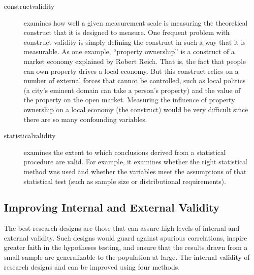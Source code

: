 \begin{description}
	\item[\Gls{constructvalidity}] examines how well a given measurement scale is measuring the theoretical construct that it is designed to measure. One frequent problem with construct validity is simply defining the construct in such a way that it is measurable. As one example, ``property ownership'' is a construct of a market economy explained by Robert Reich\cite{reich2016saving}. That is, the fact that people can own property drives a local economy. But this construct relies on a number of external forces that cannot be controlled, such as local politics (a city's eminent domain can take a person's property) and the value of the property on the open market. Measuring the influence of property ownership on a local economy (the construct) would be very difficult since there are so many confounding variables. 
	
	\item[\Gls{statisticalvalidity}] examines the extent to which conclusions derived from a statistical procedure are valid. For example, it examines whether the right statistical method was used and whether the variables meet the assumptions of that statistical test (such as sample size or distributional requirements). 
	
\end{description}

\subsection{Improving Internal and External Validity}

The best research designs are those that can assure high levels of internal and external validity. Such designs would guard against spurious correlations, inspire greater faith in the hypotheses testing, and ensure that the results drawn from a small sample are generalizable to the population at large. The internal validity of research designs and can be improved using four methods.

